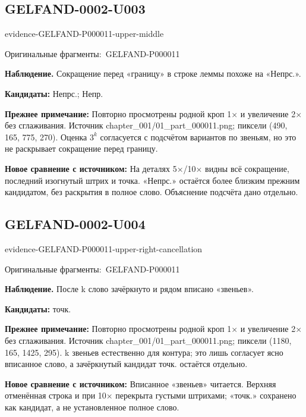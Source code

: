 \documentclass[11pt]{article}
\newcommand{\EvidenceBlock}[4]{%
 \par\smallskip\noindent\begin{minipage}{\linewidth}
 \begin{minipage}[t]{.47\linewidth}\vspace{0pt}\centering
 \csname evidence-#1-#2\endcsname\par
 {\scriptsize\SourceCropCaption\ #1}\par
 \end{minipage}\hfill
 \begin{minipage}[t]{.49\linewidth}\vspace{0pt}\raggedright
 {\small\color{orange!65!black}\textbf{#4} #3}\par
 \end{minipage}
 \end{minipage}\par\smallskip}
\newcommand{\SourceCropCaption}{Оригинальные фрагменты:}\newcommand{\ReadingCaption}{Сомнительное чтение.}\newcommand{\IncompleteCaption}{Неразобранный фрагмент.}\newcommand{\DiagramCaption}{Рисунок и набранное описание.}
\begin{document}
\subsection*{GELFAND-0002-U003}
\EvidenceBlock{GELFAND-P000011}{upper-middle}{Сокращение перед «границу» в строке леммы похоже на «Непрс.».}{Наблюдение.}
\par\smallskip\noindent\textbf{Кандидаты: } Непрс.; Непр.\par
\par\smallskip\noindent\textbf{Прежнее примечание: } Повторно просмотрены родной кроп 1× и увеличение 2× без сглаживания. Источник chapter\_001/01\_part\_000011.png; пиксели (490, 165, 775, 270). Оценка \(3^k\) согласуется с подсчётом вариантов по звеньям, но это не раскрывает сокращение перед границу.\par
\par\smallskip\noindent\textbf{Новое сравнение с источником: } На деталях 5×/10× видны всё сокращение, последний изогнутый штрих и точка. «Непрс.» остаётся более близким прежним кандидатом, без раскрытия в полное слово. Объяснение подсчёта дано отдельно.\par

\subsection*{GELFAND-0002-U004}
\EvidenceBlock{GELFAND-P000011}{upper-right-cancellation}{После k слово зачёркнуто и рядом вписано «звеньев».}{Наблюдение.}
\par\smallskip\noindent\textbf{Кандидаты: } точк.\par
\par\smallskip\noindent\textbf{Прежнее примечание: } Повторно просмотрены родной кроп 1× и увеличение 2× без сглаживания. Источник chapter\_001/01\_part\_000011.png; пиксели (1180, 165, 1425, 295). k звеньев естественно для контура; это лишь согласует ясно вписанное слово, а зачёркнутый кандидат точк. остаётся отдельно.\par
\par\smallskip\noindent\textbf{Новое сравнение с источником: } Вписанное «звеньев» читается. Верхняя отменённая строка и при 10× перекрыта густыми штрихами; «точк.» сохранено как кандидат, а не установленное полное слово.\par
\end{document}

